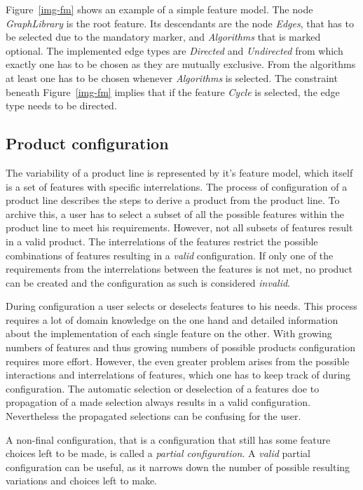 Figure~\ref{img-fm} shows an example of a simple feature model. The node \textit{GraphLibrary} is the root feature. Its descendants are the node \textit{Edges}, that has to be selected due to the mandatory marker, and \textit{Algorithms} that is marked optional. The implemented edge types are \textit{Directed} and \textit{Undirected} from which exactly one has to be chosen as they are mutually exclusive. From the algorithms at least one has to be chosen whenever \textit{Algorithms} is selected. The constraint beneath Figure~\ref{img-fm} implies that if the feature \textit{Cycle} is selected, the edge type needs to be directed.

\subsection{Product configuration}
The variability of a product line is represented by it's feature model, which itself is a set of features with specific interrelations. The process of configuration of a product line describes the steps to derive a product from the product line. To archive this, a user has to select a subset of all the possible features within the product line to meet his requirements. However, not all subsets of features result in a valid product. The interrelations of the features restrict the possible combinations of features resulting in a \textit{valid} configuration. If only one of the requirements from the interrelations between the features is not met, no product can be created and the configuration as such is considered \textit{invalid}.

During configuration a user selects or deselects features to his needs. This process requires a lot of domain knowledge on the one hand and detailed information about the implementation of each single feature on the other. With growing numbers of features and thus growing numbers of possible products configuration requires more effort. However, the even greater problem arises from the possible interactions and interrelations of features, which one has to keep track of during configuration. The automatic selection or deselection of a features doe to propagation of a made selection always results in a valid configuration. Nevertheless the propagated selections can be confusing for the user. 

A non-final configuration, that is a configuration that still has some feature choices left to be made, is called a \textit{partial configuration}. A \textit{valid} partial configuration can be useful, as it narrows down the number of possible resulting variations and choices left to make.

